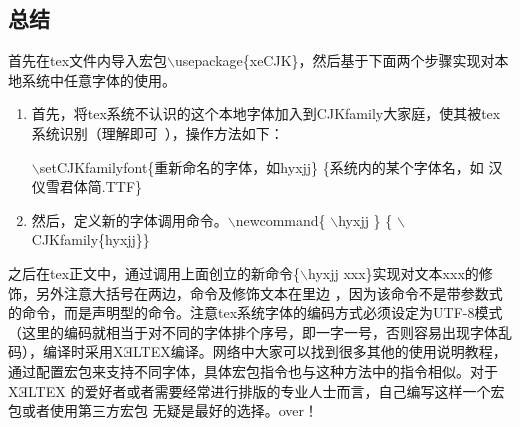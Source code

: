 \documentclass[10pt,a4paper,openany]{article}
\begin{document}
		\subsection{总结}
		
		首先在tex文件内导入宏包$ \backslash $usepackage\{xeCJK\}，然后基于下面两个步骤实现对本地系统中任意字体的使用。
		\begin{enumerate}
			\item 首先，将tex系统不认识的这个本地字体加入到CJKfamily大家庭，使其被tex系统识别（理解即可~），操作方法如下：
			
			$ \backslash $setCJKfamilyfont\{重新命名的字体，如hyxjj\} \{系统内的某个字体名，如 汉仪雪君体简.TTF\}		
			
			\item 然后，定义新的字体调用命令。$ \backslash $newcommand\{  $ \backslash $hyxjj \} \{  $ \backslash $CJKfamily\{hyxjj\}\} %
			
		\end{enumerate}
			
		
		之后在tex正文中，通过调用上面创立的新命令\{$ \backslash $hyxjj xxx\}实现对文本xxx的修饰，另外注意{\kaishu 大括号在两边，命令及修饰文本在里边 }，因为该命令不是带参数式的命令，而是声明型的命令。注意tex系统字体的编码方式必须设定为UTF-8模式（这里的编码就相当于对不同的字体排个序号，即一字一号，否则容易出现字体乱码），编译时采用XƎLTEX编译。网络中大家可以找到很多其他的使用说明教程，通过配置宏包来支持不同字体，具体宏包指令也与这种方法中的指令相似。对于 XƎLTEX 的爱好者或者需要经常进行排版的专业人士而言，自己编写这样一个宏包或者使用第三方宏包 无疑是最好的选择。over！
		
\end{document}
